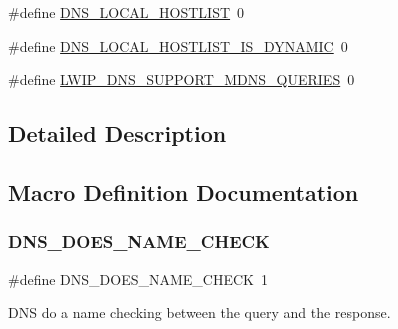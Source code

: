 \begin{DoxyCompactItemize}
\item 
\#define \hyperlink{group__lwip__opts__dns_gacba1ac491c1b47b98dfbd0d5c1662659}{D\+N\+S\+\_\+\+L\+O\+C\+A\+L\+\_\+\+H\+O\+S\+T\+L\+I\+ST}~0
\item 
\#define \hyperlink{group__lwip__opts__dns_ga8235a5fb0a1c1cceeee670cf95612ba8}{D\+N\+S\+\_\+\+L\+O\+C\+A\+L\+\_\+\+H\+O\+S\+T\+L\+I\+S\+T\+\_\+\+I\+S\+\_\+\+D\+Y\+N\+A\+M\+IC}~0
\item 
\#define \hyperlink{group__lwip__opts__dns_gafcbde5706a70ace562bd1f7d2d6f77cb}{L\+W\+I\+P\+\_\+\+D\+N\+S\+\_\+\+S\+U\+P\+P\+O\+R\+T\+\_\+\+M\+D\+N\+S\+\_\+\+Q\+U\+E\+R\+I\+ES}~0
\end{DoxyCompactItemize}


\subsection{Detailed Description}


\subsection{Macro Definition Documentation}
\mbox{\label{group__lwip__opts__dns_ga07ffd8e9106dae3b65347bd03811a4b6}} 
\subsubsection{\texorpdfstring{D\+N\+S\+\_\+\+D\+O\+E\+S\+\_\+\+N\+A\+M\+E\+\_\+\+C\+H\+E\+CK}{DNS\_DOES\_NAME\_CHECK}\hspace{0.1cm}{\footnotesize\ttfamily [1/2]}}
{\footnotesize\ttfamily \#define D\+N\+S\+\_\+\+D\+O\+E\+S\+\_\+\+N\+A\+M\+E\+\_\+\+C\+H\+E\+CK~1}

D\+NS do a name checking between the query and the response. \mbox{\label{group__lwip__opts__dns_ga07ffd8e9106dae3b65347bd03811a4b6}} 
